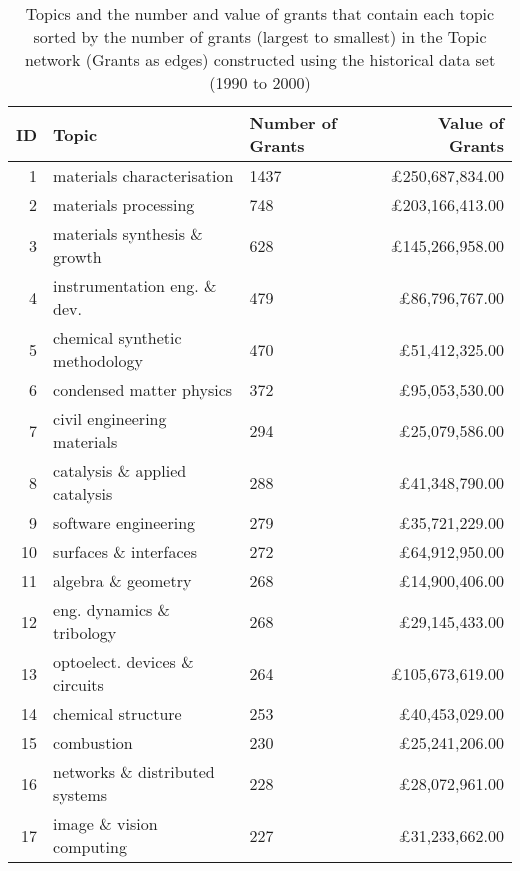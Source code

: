 \begin{spacing}{0.9}
\begin{longtable}[c]{r|>{\raggedleft\arraybackslash}m{6.5cm}|>{\raggedleft\arraybackslash}m{1.9cm}|r}
\caption[Topics and the number and value of grants that contain each topic in the Topic network (Grants as edges) constructed using the historical data set (1990 to 2000)]{Topics and the number and value of grants that contain each topic sorted by the number of grants (largest to smallest) in the Topic network (Grants as edges) constructed using the historical data set (1990 to 2000)}\\
\label{table:topic_a_past2_topics_appendix}
\textbf{ID} & \textbf{Topic} & \textbf{Number of Grants} & \textbf{Value of Grants}\\
\hline
\endhead
{1} & {materials characterisation} & {1437} & {\pounds250,687,834.00}\\
{2} & {materials processing} & {748} & {\pounds203,166,413.00}\\
{3} & {materials synthesis \& growth} & {628} & {\pounds145,266,958.00}\\
{4} & {instrumentation eng. \& dev.} & {479} & {\pounds86,796,767.00}\\
{5} & {chemical synthetic methodology} & {470} & {\pounds51,412,325.00}\\
{6} & {condensed matter physics} & {372} & {\pounds95,053,530.00}\\
{7} & {civil engineering materials} & {294} & {\pounds25,079,586.00}\\
{8} & {catalysis \& applied catalysis} & {288} & {\pounds41,348,790.00}\\
{9} & {software engineering} & {279} & {\pounds35,721,229.00}\\
{10} & {surfaces \& interfaces} & {272} & {\pounds64,912,950.00}\\
{11} & {algebra \& geometry} & {268} & {\pounds14,900,406.00}\\
{12} & {eng. dynamics \& tribology} & {268} & {\pounds29,145,433.00}\\
{13} & {optoelect. devices \& circuits} & {264} & {\pounds105,673,619.00}\\
{14} & {chemical structure} & {253} & {\pounds40,453,029.00}\\
{15} & {combustion} & {230} & {\pounds25,241,206.00}\\
{16} & {networks \& distributed systems} & {228} & {\pounds28,072,961.00}\\
{17} & {image \& vision computing} & {227} & {\pounds31,233,662.00}\\

\end{longtable}
\end{spacing}
